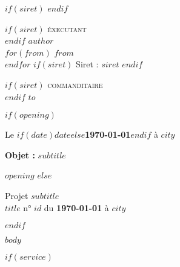 \documentclass{/opt/class}
\begin{document}
$if(siret)$
  \logo
$endif$

\begin{multicols}{2}
  $if(siret)$
    {\small \textsc{éxecutant}}\\
  $endif$
  \textbf{$author$}\\
  $for(from)$
  $from$\\
  $endfor$
  $if(siret)$
    {\footnotesize Siret : $siret$}
  $endif$

  \begin{flushright}
    $if(siret)$
      {\small \textsc{commanditaire}}\\
    $endif$
    $to$
  \end{flushright}
\end{multicols}

$if(opening)$
  \begin{flushright}
    Le \textbf{$if(date)$$date$$else$\today{}$endif$} à $city$\hspace*{72pt}
  \end{flushright}
  \vspace{2em}

  \textbf{Objet :} $subtitle$
  \vspace{2em}

  \setlength{\parindent}{24pt}
  $opening$
  \setlength{\parindent}{0pt}
  \vspace{1em}
$else$
  \hr

  Projet \textbf{$subtitle$}\\
  $title$ n° \textbf{$id$} du \textbf{\today{}} à $city$

  \hr
$endif$

$body$

$if(service)$
  \hr
  \STsetdecimalsep{,}
  \renewcommand\STprintnum[1]{\numprint{#1}}
\end{document}
